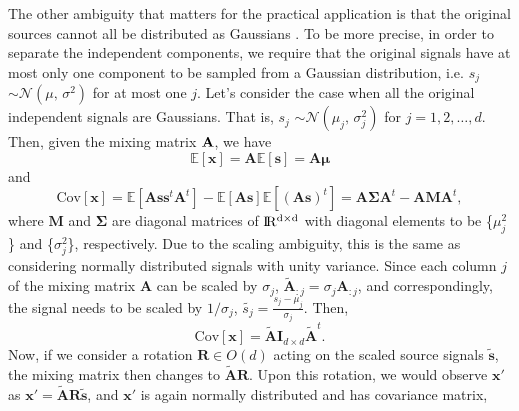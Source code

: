 \documentclass[aps,prl,preprint,superscriptaddress]{revtex4-2}
\begin{document}
The other ambiguity that matters for the practical application is that the original sources cannot all be distributed as Gaussians \cite{lee1998independent, ng_cs229}.
To be more precise, in order to separate the independent components, we require that the original signals have at most only one component to be sampled from a Gaussian distribution, i.e. $s_{j}$ $\sim \mathcal{N}(\mu,\,\sigma^{2})$ for at most one $j$. Let's consider the case when all the original independent signals are Gaussians. That is, $s_{j}$ $\sim \mathcal{N}(\mu_{j},\,\sigma_{j}^{2})$ for $j = 1, 2, \ldots, d$.
Then, given the mixing matrix $\bf{A}$, we have
\begin{equation}
\mathbb{E}[\mathbf{x}] = \mathbf{A}\mathbb{E}[\mathbf{s}] = \mathbf{A}\bm{\mu}
\end{equation}
and
\begin{equation}
\mathrm{Cov}[\mathbf{x}] = \mathbb{E}[\mathbf{As}\mathbf{s}^t\mathbf{A}^{t}]-\mathbb{E}[\mathbf{As}]\mathbb{E}[(\mathbf{As})^{t}] =  \mathbf{A}\bm{\Sigma}\mathbf{A}^{t}-\mathbf{A}\mathbf{M}\mathbf{A}^{t},
\end{equation}
where $\mathbf{M}$ and $\bm{\Sigma}$ are diagonal matrices of $\rm I\!R^{d\times d}$ with diagonal elements to be \{$\mu_{j}^{2}$\} and \{$\sigma_{j}^{2}$\}, respectively.
Due to the scaling ambiguity, this is the same as considering normally distributed signals with unity variance. Since each column $j$ of the mixing matrix $\mathbf{A}$ can be scaled by $\sigma_{j}$, $\tilde{\mathbf{A}}_{:j} = \sigma_{j}\mathbf{A}_{:j}$, and correspondingly, the signal needs to be scaled by $1/\sigma_{j}$, $\tilde{s_{j}} = \frac{s_{j}-\mu_{j}}{\sigma_{j}}$. Then,
\begin{equation}
\mathrm{Cov}[\mathbf{x}] = \tilde{\mathbf{A}}\mathbf{I}_{d\times d}\tilde{\mathbf{A}}^{t}.
\end{equation}
Now, if we consider a rotation $\mathbf{R} \in O(d)$ acting on the scaled source signals $\mathbf{\tilde{s}}$, the mixing matrix then changes to $\tilde{\mathbf{A}}\mathbf{R}$.
Upon this rotation, we would observe $\mathbf{x'}$ as $\mathbf{x'} = \tilde{\mathbf{A}}\mathbf{R}\tilde{\mathbf{s}}$, and $\mathbf{x'}$ is again normally distributed and has covariance matrix,
\end{document}

